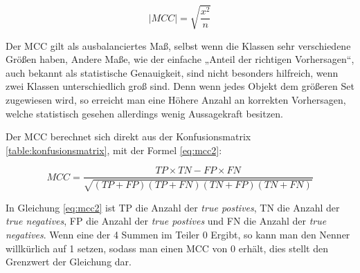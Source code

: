 \begin{equation}
    |MCC| = \sqrt{\frac{x^2}{n}}
    \label{eq:mcc}
\end{equation}

Der MCC gilt als ausbalanciertes Maß, selbst wenn die Klassen sehr verschiedene Größen haben, Andere Maße, wie der einfache „Anteil der richtigen Vorhersagen“, auch bekannt als statistische Genauigkeit, sind nicht besonders hilfreich, wenn zwei Klassen unterschiedlich groß sind. Denn wenn jedes Objekt dem größeren Set zugewiesen wird, so erreicht man eine Höhere Anzahl an korrekten Vorhersagen, welche statistisch gesehen allerdings wenig Aussagekraft besitzen.

Der MCC berechnet sich direkt aus der Konfusionsmatrix \ref{table:konfusionsmatrix}, mit der Formel \ref{eq:mcc2}:

\begin{table}[]
    \centering
        \caption{Dargestellt ist die Konfusionsmatrix.}
    \label{table:konfusionsmatrix}
\end{table}

\begin{equation}
    MCC = \frac{TP \times TN - FP \times FN}{\sqrt{(TP + FP)(TP + FN)(TN + FP)(TN + FN)}}
    \label{eq:mcc2}
\end{equation}

In Gleichung \ref{eq:mcc2} ist TP die Anzahl der \emph{true postives}, TN die Anzahl der \emph{true negatives}, FP die Anzahl der \emph{true postives} und FN die Anzahl der \emph{true negatives}. Wenn eine der 4 Summen im Teiler 0 Ergibt, so kann man den Nenner willkürlich auf 1 setzen, sodass man einen MCC von 0 erhält, dies stellt den Grenzwert der Gleichung dar.


